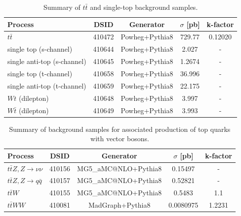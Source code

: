 \begin{table}[htbp]
\centering
\scriptsize
\begin{tabularx}{400pt}{|X||c|c|c|c|}
\hline
\centering \textbf{Process} & \textbf{DSID} & \textbf{Generator} & \textbf{$\sigma$ [pb]} & \textbf{k-factor}\\
\hline
\centering $t\bar{t}$ & 410472 & Powheg+Pythia8 & 729.77 & 0.12020 \\ \hline 
\centering single top (s-channel) & 410644 & Powheg+Pythia8 & 2.027 & - \\ \hline
\centering single anti-top (s-channel) & 410645 & Powheg+Pythia8 & 1.2674 & - \\ \hline 
\centering single top (t-channel) & 410658 & Powheg+Pythia8 & 36.996 & - \\ \hline 
\centering single anti-top (t-channel) & 410659 & Powheg+Pythia8 & 22.175 & - \\ \hline 
\centering $Wt$ (dilepton) & 410648 & Powheg+Pythia8 & 3.997 & - \\ \hline 
\centering $W\bar{t}$ (dilepton) & 410649 & Powheg+Pythia8 & 3.993 & - \\ \hline 
\end{tabularx}
\caption{\rm Summary of $t\bar{t}$ and single-top background samples.}
\label{tab:Topsamples}
\end{table}

\begin{table}[htbp]
\centering
\scriptsize
\begin{tabularx}{400pt}{|X||c|c|c|c|}
\hline
\centering \textbf{Process} & \textbf{DSID} & \textbf{Generator} & \textbf{$\sigma$ [pb]} & \textbf{k-factor}\\
\hline
\centering $t\bar{t}Z, Z\rightarrow \nu \nu$  & 410156 & MG5\_aMC@NLO+Pythia8 & 0.15497 & - \\ \hline 
\centering $t\bar{t}Z, Z\rightarrow q\bar{q}$ & 410157 & MG5\_aMC@NLO+Pythia8 & 0.52821 & - \\ \hline 
\centering $t\bar{t}W$ & 410155 & MG5\_aMC@NLO+Pythia8 & 0.5483 & 1.1 \\ \hline 
\centering $t\bar{t}WW$ & 410081 & MadGraph+Pythia8 & 0.0080975 & 1.2231 \\ \hline
\end{tabularx}
\caption{\rm Summary of background samples for associated production of top quarks with vector bosons.}
\label{tab:ttVsamples}
\end{table}


